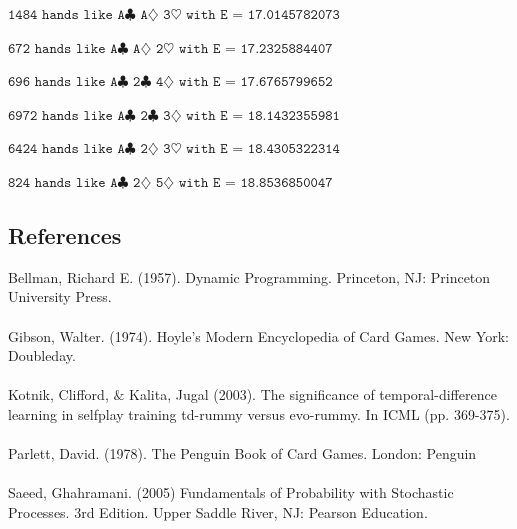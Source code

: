 \documentclass[letter,12pt]{article}
\begin{document}
{$\texttt{1484 hands like A$\clubsuit$ A$\diamondsuit$ 3$\heartsuit$ with E = 17.0145782073}$

$\texttt{672 hands like A$\clubsuit$ A$\diamondsuit$ 2$\heartsuit$ with E = 17.2325884407}$

$\texttt{696 hands like A$\clubsuit$ 2$\clubsuit$ 4$\diamondsuit$ with E = 17.6765799652}$

$\texttt{6972 hands like A$\clubsuit$ 2$\clubsuit$ 3$\diamondsuit$ with E = 18.1432355981}$

$\texttt{6424 hands like A$\clubsuit$ 2$\diamondsuit$ 3$\heartsuit$ with E = 18.4305322314}$

$\texttt{824 hands like A$\clubsuit$ 2$\diamondsuit$ 5$\diamondsuit$ with E = 18.8536850047}$

\newpage

\begin{center}\section*{References}\end{center}

Bellman, Richard E. (1957). Dynamic Programming. Princeton, NJ: Princeton University Press. 
\\
\\
Gibson, Walter. (1974). Hoyle’s Modern Encyclopedia of Card Games. New York: Doubleday. 
\\
\\
Kotnik, Clifford, $\&$ Kalita, Jugal (2003). The significance of temporal-difference learning in selfplay training td-rummy versus evo-rummy. In ICML (pp. 369-375). 
\\
\\
Parlett, David. (1978). The Penguin Book of Card Games. London: Penguin 
\\
\\
Saeed, Ghahramani. (2005) Fundamentals of Probability with Stochastic Processes. 3rd Edition.  Upper Saddle River, NJ: Pearson Education.
}
\end{document}
